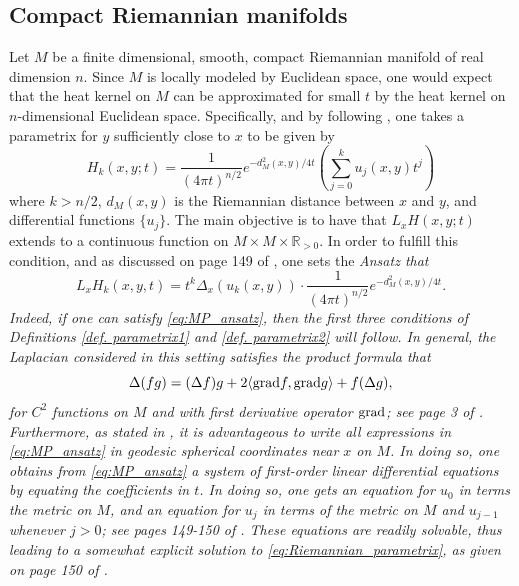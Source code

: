 \documentclass[11pt,reqno]{amsart}
\theoremstyle{remark}
\theoremstyle{definition}
\numberwithin{theorem}{section} \numberwithin{equation}{section}
\begin{document}
\subsection{Compact Riemannian manifolds}\label{subsec:Riemannian_HK}
Let $M$ be a finite dimensional, smooth, compact Riemannian manifold of real dimension $n$.
Since $M$ is locally modeled by Euclidean space, one would expect that the
heat kernel on $M$ can be approximated  for small $t$ by the heat kernel on $n$-dimensional Euclidean space.  Specifically, and
by following \cite{MP49}, one takes a parametrix
for $y$ sufficiently close to $x$ to be given by
\begin{equation}\label{eq:Riemannian_parametrix}
H_{k}(x,y;t) = \frac{1}{(4 \pi t)^{n/2}}e^{-d^{2}_{M}(x,y)/4t}\left(\sum\limits_{j=0}^{k}u_{j}(x,y)t^{j}\right)
\end{equation}
where $k > n/2$, $d_{M}(x,y)$ is the Riemannian distance between $x$ and $y$,
and differential functions $\{u_{j}\}$.  The main objective is to have that $L_{x}H(x,y;t)$ extends to a continuous
function on $M\times M \times \mathbb{R}_{>0}$.  In order to fulfill this condition, and as discussed on page 149 of \cite{Ch84}, one
sets the \it Ansatz \rm that
\begin{equation}\label{eq:MP_ansatz}
L_{x} H_{k}(x,y,t) = t^{k}\Delta_{x}(u_{k}(x,y))\cdot \frac{1}{(4 \pi t)^{n/2}}e^{-d^{2}_{M}(x,y)/4t}.
\end{equation}
Indeed, if one can satisfy \eqref{eq:MP_ansatz}, then the first three conditions of Definitions \ref{def. parametrix1} and \ref{def. parametrix2}
will follow.  In general, the Laplacian considered in this setting satisfies the product formula that
\begin{equation}\label{eq:Laplacian_of_a_product}
\Delta (fg) = (\Delta f)g + 2\langle \text{\rm grad}f, \text{\rm grad}g \rangle + f (\Delta g),
\end{equation}
for $C^{2}$ functions on $M$ and with first derivative operator $\text{\rm grad}$; see page 3 of \cite{Ch84}.
Furthermore, as stated in \cite{Ch84}, it is advantageous to write all expressions in \eqref{eq:MP_ansatz} in geodesic spherical
coordinates near $x$ on $M$.  In doing so, one obtains from \eqref{eq:MP_ansatz}
a system of \it first-order linear differential equations \rm by equating the coefficients in $t$.  In doing so, one
gets an equation for $u_{0}$ in terms the metric on $M$, and an equation for $u_{j}$ in terms of
the metric on $M$ and $u_{j-1}$ whenever $j>0$; see pages 149-150 of \cite{Ch84}.  These equations are readily solvable,
thus leading to a somewhat explicit solution to \eqref{eq:Riemannian_parametrix}, as given on page 150 of \cite{Ch84}.
\end{document}
